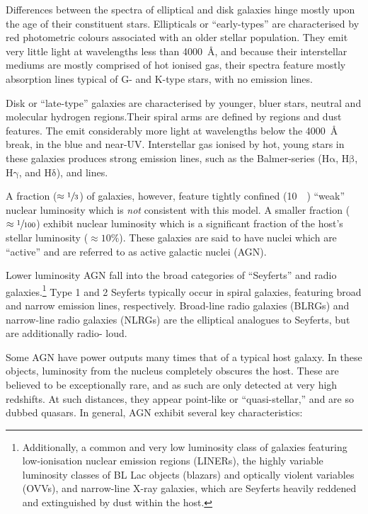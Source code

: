 \documentclass[a4paper,12pt]{article}
\begin{document}
Differences between the spectra of elliptical and disk galaxies hinge mostly
upon the age of their constituent stars. Ellipticals or ``early-types'' are
characterised by red photometric colours associated with an older stellar
population. They emit very little light at wavelengths less than
\SI{4000}{\angstrom}, and because their interstellar mediums are mostly
comprised of hot ionised gas, their spectra feature mostly absorption lines
typical of G- and K-type stars, with no emission lines.\cite{Mo_2010}

Disk or ``late-type'' galaxies are characterised by younger, bluer stars,
neutral  and molecular  hydrogen regions.Their spiral
arms are defined by  regions and dust features. The emit
considerably more light at wavelengths below the \SI{4000}{\angstrom} break, in
the blue and near-UV. Interstellar gas ionised by hot, young stars in these
galaxies produces strong emission lines, such as the Balmer-series
($\mathrm{H\alpha}$, $\mathrm{H\beta}$, $\mathrm{H\gamma}$, and
$\mathrm{H\delta}$),  and  lines.\cite{Mo_2010}

A fraction ($\approx \sfrac{1}{3}$) of galaxies, however, feature tightly
confined (\SI{10}{\kilo\parsec}) ``weak'' nuclear luminosity which is
\textit{not} consistent with this model.\cite{McClure_2019} A smaller fraction
($\approx \sfrac{1}{100}$) exhibit nuclear luminosity which is a significant
fraction of the host's stellar luminosity ($\approx 10\%$).\cite{Sparke_2000}
These galaxies are said to have nuclei which are ``active'' and are referred to
as active galactic nuclei (AGN).\cite{Peterson_1997}

Lower luminosity AGN fall into the broad categories of ``Seyferts'' and radio
galaxies.\footnote{Additionally, a common and very low luminosity class of
galaxies featuring low-ionisation nuclear emission regions (LINERs), the highly
variable luminosity classes of BL Lac objects (blazars) and optically violent
variables (OVVs), and narrow-line X-ray galaxies, which are Seyferts heavily
reddened and extinguished by dust within the host.} Type 1 and 2 Seyferts
typically occur in spiral galaxies, featuring broad and narrow emission lines,
respectively. Broad-line radio galaxies (BLRGs) and narrow-line radio galaxies
(NLRGs) are the elliptical analogues to Seyferts, but are additionally radio-
loud.\cite{Peterson_1997}

Some AGN have power outputs many times that of a typical host galaxy. In these
objects, luminosity from the nucleus completely obscures the host. These are
believed to be exceptionally rare, and as such are only detected at very high
redshifts. At such distances, they appear point-like or  ``quasi-stellar,'' and
are so dubbed quasars.\cite{Peterson_1997} In general, AGN exhibit several key
characteristics:
\end{document}
